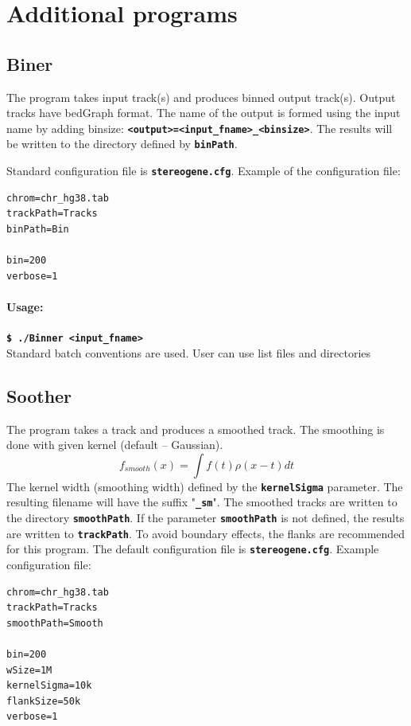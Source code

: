 \documentclass{article}
\newcommand{\prm}[1]{\texttt{\textbf{{#1}}}}
\begin{document}
\section{Additional programs}
\subsection{Biner}\label{biner}
The program takes input track(s) and produces binned output track(s). Output tracks have bedGraph format. 
The name of the output is formed using the input name by adding binsize: \prm{<output>=<input\_fname>\_<binsize>}. The results will be written to the directory defined by \prm{binPath}.

Standard configuration file is \prm{stereogene.cfg}. Example of the configuration file:
\begin{shaded} 
\begin{verbatim}
chrom=chr_hg38.tab
trackPath=Tracks
binPath=Bin

bin=200
verbose=1
\end{verbatim}
\end{shaded}

\paragraph{Usage:}
\prm{\$ ./Binner <input\_fname>}\\
Standard batch conventions are used. User can use list files and directories
\subsection{Soother}\label{smoother}
The program takes a track and produces a smoothed track. The smoothing is done with given kernel (default -- Gaussian). 
$$
f_{smooth}(x)=\int f(t) \rho(x-t) dt
$$
The kernel width (smoothing width) defined by the \prm{kernelSigma} parameter. The resulting filename will have the suffix "\prm{\_sm}". The smoothed tracks are written to the directory \prm{smoothPath}. If the parameter \prm{smoothPath} is not defined, the results are written to \prm{trackPath}. 
To avoid boundary effects, the flanks are recommended for this program.
The default configuration file is \prm{stereogene.cfg}. Example configuration file:
\begin{shaded} 
\begin{verbatim}
chrom=chr_hg38.tab
trackPath=Tracks
smoothPath=Smooth

bin=200
wSize=1M
kernelSigma=10k
flankSize=50k
verbose=1
\end{verbatim}
\end{shaded}
\end{document}
